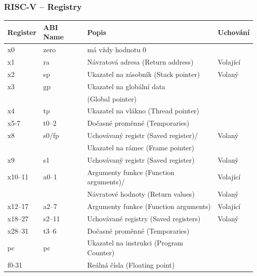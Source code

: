 \documentclass{beamer}
\begin{document}
\begin{frame}[shrink=12]
\frametitle{RISC-V -- Registry}
\begin{tabular}{|l|l|l|l|}\hline
Register & ABI Name & Popis & Uchování \\ \hline
x0 & zero & má vždy hodnotu 0 &  \\\hline
x1 & ra & Návratová adresa (Return address) & Volající \\\hline
x2 & sp & Ukazatel na zásobník (Stack pointer) &  Volaný\\\hline
x3 & gp & Ukazatel na globální data &  \\
   &    & (Global pointer) &  \\\hline
x4 & tp & Ukazatel na vlákno (Thread pointer) &  \\\hline
x5-7 & t0--2 & Dočasné proměnné (Temporaries) &  \\\hline
x8 & s0/fp & Uchovávaný registr (Saved register)/ & Volaný \\
   &       & Ukazatel na rámec (Frame pointer) &  \\\hline
x9 & s1 & Uchovávaný registr (Saved register) &  Volaný \\\hline
x10--11 & a0--1 & Argumenty funkce (Function arguments)/ &  Volající \\
 &  & Návratové hodnoty (Return values) &  Volaný \\\hline
x12--17 & a2--7 & Argumenty funkce (Function arguments) & Volající \\\hline
x18--27 & s2--11 & Uchovávané registry (Saved registers) & Volaný \\\hline
x28--31 & t3--6 & Dočasné proměnné (Temporaries) &  \\\hline
pc & pc & Ukazatel na instrukci (Program Counter) &  \\\hline
f0-31 &  & Reálná čísla (Floating point) &  \\\hline
\end{tabular}
\end{frame}
\end{document}
